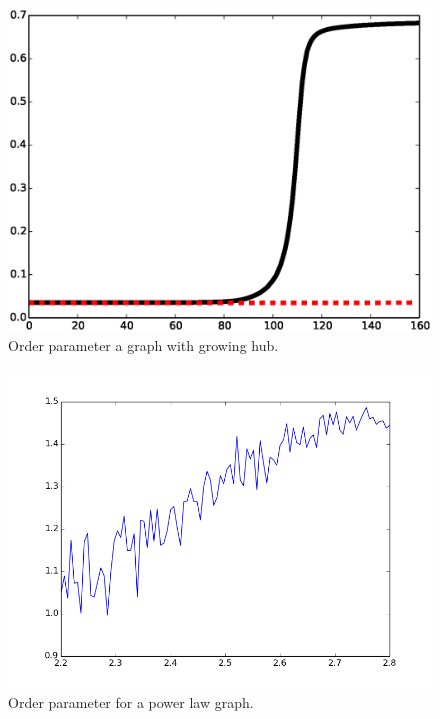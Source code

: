 \documentclass[twocolumn,prl,superscriptaddress]{revtex4}
\begin{document}
\begin{figure}
\begin{center}
\includegraphics[width=\columnwidth]{op.eps}
\end{center}
\caption{Order parameter a graph with growing hub.}
\label{fig:order-parameter}
\end{figure}

\begin{figure}
\begin{center}
\includegraphics[width=\columnwidth]{power_plot.png}
\end{center}
\caption{Order parameter for a power law graph.}
\label{fig:power-law}
\end{figure}


\end{document}
